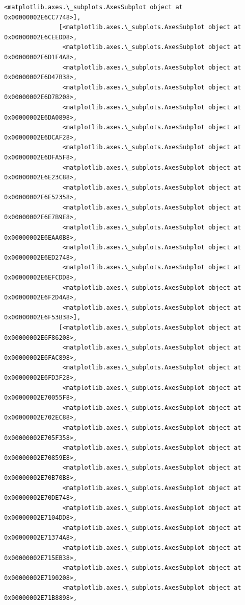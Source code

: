 \documentclass[11pt]{article}
\begin{document}
\begin{Verbatim}[commandchars=\\\{\}]
                <matplotlib.axes.\_subplots.AxesSubplot object at 0x00000002E6CC7748>],
               [<matplotlib.axes.\_subplots.AxesSubplot object at 0x00000002E6CEEDD8>,
                <matplotlib.axes.\_subplots.AxesSubplot object at 0x00000002E6D1F4A8>,
                <matplotlib.axes.\_subplots.AxesSubplot object at 0x00000002E6D47B38>,
                <matplotlib.axes.\_subplots.AxesSubplot object at 0x00000002E6D7B208>,
                <matplotlib.axes.\_subplots.AxesSubplot object at 0x00000002E6DA0898>,
                <matplotlib.axes.\_subplots.AxesSubplot object at 0x00000002E6DCAF28>,
                <matplotlib.axes.\_subplots.AxesSubplot object at 0x00000002E6DFA5F8>,
                <matplotlib.axes.\_subplots.AxesSubplot object at 0x00000002E6E23C88>,
                <matplotlib.axes.\_subplots.AxesSubplot object at 0x00000002E6E52358>,
                <matplotlib.axes.\_subplots.AxesSubplot object at 0x00000002E6E7B9E8>,
                <matplotlib.axes.\_subplots.AxesSubplot object at 0x00000002E6EAA0B8>,
                <matplotlib.axes.\_subplots.AxesSubplot object at 0x00000002E6ED2748>,
                <matplotlib.axes.\_subplots.AxesSubplot object at 0x00000002E6EFCDD8>,
                <matplotlib.axes.\_subplots.AxesSubplot object at 0x00000002E6F2D4A8>,
                <matplotlib.axes.\_subplots.AxesSubplot object at 0x00000002E6F53B38>],
               [<matplotlib.axes.\_subplots.AxesSubplot object at 0x00000002E6F86208>,
                <matplotlib.axes.\_subplots.AxesSubplot object at 0x00000002E6FAC898>,
                <matplotlib.axes.\_subplots.AxesSubplot object at 0x00000002E6FD3F28>,
                <matplotlib.axes.\_subplots.AxesSubplot object at 0x00000002E70055F8>,
                <matplotlib.axes.\_subplots.AxesSubplot object at 0x00000002E702EC88>,
                <matplotlib.axes.\_subplots.AxesSubplot object at 0x00000002E705F358>,
                <matplotlib.axes.\_subplots.AxesSubplot object at 0x00000002E70859E8>,
                <matplotlib.axes.\_subplots.AxesSubplot object at 0x00000002E70B70B8>,
                <matplotlib.axes.\_subplots.AxesSubplot object at 0x00000002E70DE748>,
                <matplotlib.axes.\_subplots.AxesSubplot object at 0x00000002E7104DD8>,
                <matplotlib.axes.\_subplots.AxesSubplot object at 0x00000002E71374A8>,
                <matplotlib.axes.\_subplots.AxesSubplot object at 0x00000002E715EB38>,
                <matplotlib.axes.\_subplots.AxesSubplot object at 0x00000002E7190208>,
                <matplotlib.axes.\_subplots.AxesSubplot object at 0x00000002E71B8898>,

\end{Verbatim}
\end{document}
